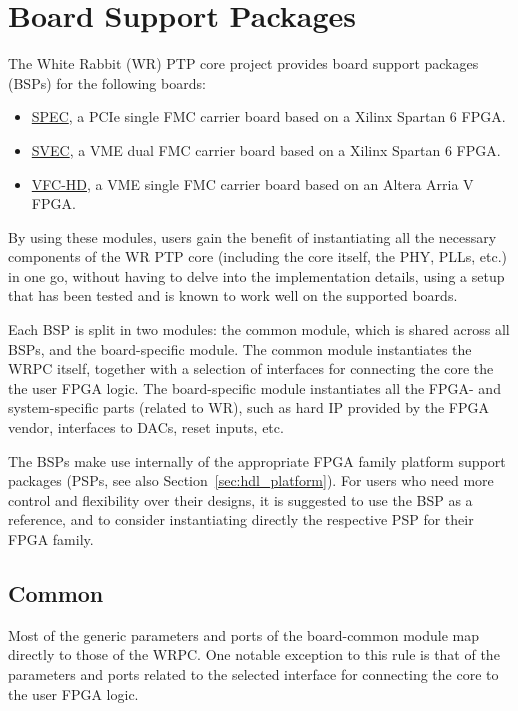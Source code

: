 \section{Board Support Packages}
\label{sec:hdl_board}

The White Rabbit (WR) PTP core project provides board support packages (BSPs) for the following
boards:
\begin{itemize}
\item \href{http://www.ohwr.org/projects/spec}{SPEC}, a PCIe single FMC carrier board based on a
  Xilinx Spartan 6 FPGA.
\item \href{http://www.ohwr.org/projects/svec}{SVEC}, a VME dual FMC carrier board based on a Xilinx
  Spartan 6 FPGA.
\item \href{http://www.ohwr.org/projects/vfc-hd}{VFC-HD}, a VME single FMC carrier board based on an
  Altera Arria V FPGA.
\end{itemize}

By using these modules, users gain the benefit of instantiating all the necessary components of the
WR PTP core (including the core itself, the PHY, PLLs, etc.) in one go, without having to delve into
the implementation details, using a setup that has been tested and is known to work well on the
supported boards.

Each BSP is split in two modules: the common module, which is shared across all BSPs, and the
board-specific module. The common module instantiates the WRPC itself, together with a selection of
interfaces for connecting the core the the user FPGA logic. The board-specific module instantiates
all the FPGA- and system-specific parts (related to WR), such as hard IP provided by the FPGA
vendor, interfaces to DACs, reset inputs, etc.

The BSPs make use internally of the appropriate FPGA family platform support packages (PSPs, see also
Section~\ref{sec:hdl_platform}). For users who need more control and flexibility over their designs,
it is suggested to use the BSP as a reference, and to consider instantiating directly the respective
PSP for their FPGA family.

\subsection{Common}
\label{sec:hdl_board_common}

Most of the generic parameters and ports of the board-common module map directly to those of the
WRPC. One notable exception to this rule is that of the parameters and ports related to the selected
interface for connecting the core to the user FPGA logic.

